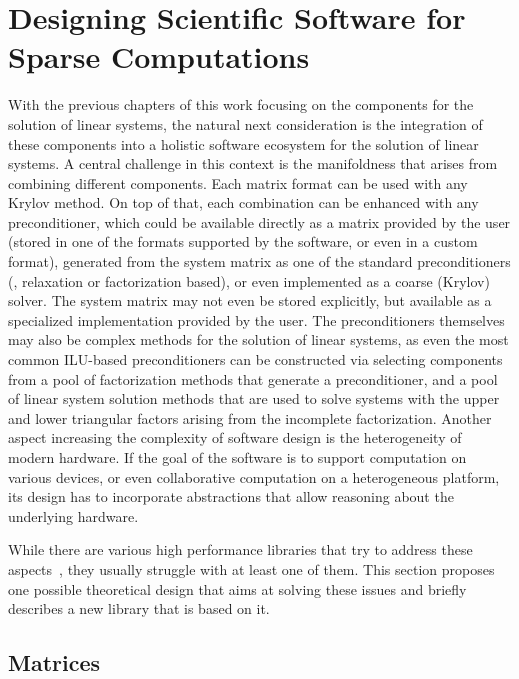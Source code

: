\section{Designing Scientific Software for Sparse Computations}

With the previous chapters of this work focusing on the components for the
solution of linear systems, the natural next consideration is the integration of
these components into a holistic software ecosystem for the solution of linear
systems.  A central challenge in this context is the manifoldness that arises
from combining different components. Each matrix format can be used with any Krylov
method. On top of that, each combination can be enhanced with any
preconditioner, which could be available directly as a matrix provided by the
user (stored in one of the formats supported by the software, or even in a
custom format), generated from the system matrix as one of the standard
preconditioners (\eg, relaxation or factorization based), or even implemented as
a coarse (Krylov) solver. The system matrix may not even be stored explicitly,
but available as a specialized implementation provided by the user. The
preconditioners themselves may also be complex methods for the solution of
linear systems, as even the most common ILU-based preconditioners can be
constructed via selecting components from a pool of factorization methods that
generate a preconditioner, and a pool of linear system solution methods that are
used to solve systems with the upper and lower triangular factors arising from
the incomplete factorization. Another aspect increasing the complexity of
software design is the heterogeneity of modern hardware. If the goal of the
software is to support computation on various devices, or even collaborative
computation on a heterogeneous platform, its design has to incorporate
abstractions that allow reasoning about the underlying hardware.

While there are various high performance libraries that try to address these
aspects~\cite{magma,vienna-cl,paralution}, they usually struggle with at least
one of them. This section proposes one possible theoretical design that aims at
solving these issues and briefly describes a new library that is based on it.

\subsection{Matrices}
\label{conclusion:ssec:matrices}

